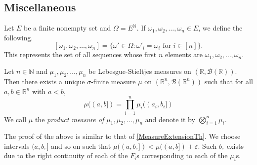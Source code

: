 \subsection{Miscellaneous}

Let $E$ be a finite nonempty set and $\Omega = E^\mathbb{N}$. If $\omega_1,\omega_2,\ldots,\omega_n\in E$, we define the following.
$$[\omega_1,\omega_2,\ldots,\omega_n]=\{\omega'\in\Omega : \omega'_i=\omega_i\text{ for }i\in[n]\}.$$
This represents the set of all sequences whose first $n$ elements are $\omega_1,\omega_2,\ldots,\omega_n$.

\begin{theorem}
        Let $n\in\mathbb{N}$ and $\mu_1,\mu_2,\ldots,\mu_n$ be Lebesgue-Stieltjes measures on $(\mathbb{R},\mathcal{B}(\mathbb{R}))$. Then there exists a unique $\sigma$-finite measure $\mu$ on $(\mathbb{R}^n, \mathcal{B}(\mathbb{R}^n))$ such that for all $a,b\in\mathbb{R}^n$ with $a<b$,
        $$\mu((a,b])=\prod_{i=1}^n \mu_i((a_i,b_i])$$
        We call $\mu$ the \textit{product measure of $\mu_1,\mu_2,\ldots,\mu_n$} and denote it by $\bigotimes_{i=1}^n\mu_i$.
\end{theorem}

The proof of the above is similar to that of \ref{MeasureExtensionTh}. We choose intervals $(a,b_\varepsilon]$ and so on such that $\mu((a,b_\varepsilon])<\mu((a,b])+\varepsilon$. Such $b_\varepsilon$ exists due to the right continuity of each of the $F_i$s corresponding to each of the $\mu_i$s.

\clearpage